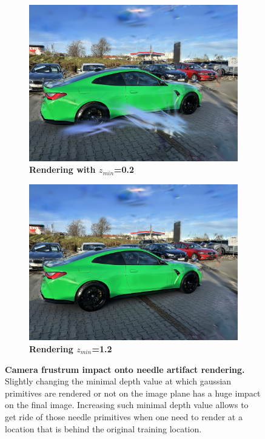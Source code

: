 \begin{figure}[htb!]
  \centering
  \begin{subfigure}[b]{0.45\linewidth}
    \includegraphics[width=\linewidth]{images/gaussiansplatting/needle-artifact.png}
    \caption{\textbf{Rendering with $z_{min}$=0.2} }
  \end{subfigure}
  \quad %
  \begin{subfigure}[b]{0.45\linewidth}
    \includegraphics[width=\linewidth]{images/gaussiansplatting/needle-free-artifact.png}
    \caption{\textbf{Rendering $z_{min}$=1.2} }
  \end{subfigure}
  \caption{\textbf{Camera frustrum impact onto needle artifact rendering.} Slightly changing the minimal depth value at which gaussian primitives are rendered or not on the image plane has a huge impact on the final image. Increasing such minimal depth value allows to get ride of those needle primitives when one need to render at a location that is behind the original training location.}
  \label{fig:floater-removed}
\end{figure}

